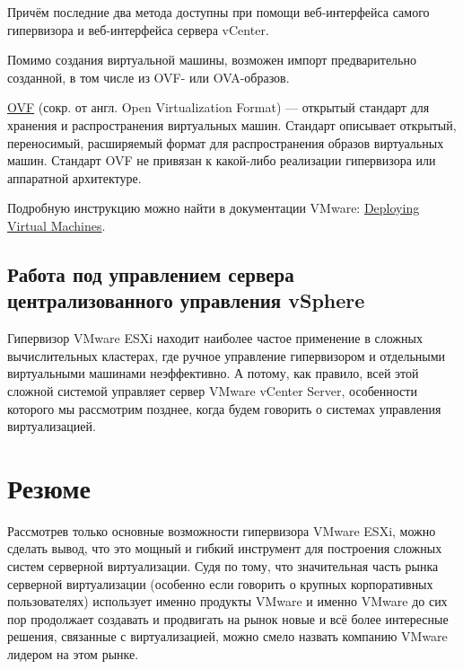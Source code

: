 \documentclass[14pt, a4paper]{article}
\begin{document}
Причём последние два метода доступны при помощи веб-интерфейса самого гипервизора и
веб-интерфейса сервера vCenter.

Помимо создания виртуальной машины, возможен импорт предварительно созданной, в том числе из
OVF- или OVA-образов.

\href{https://ru.wikipedia.org/wiki/Open_Virtualization_Format}{OVF} (сокр. от англ. Open Virtualization Format) — открытый стандарт для хранения и распространения
виртуальных машин. Стандарт описывает открытый, переносимый, расширяемый формат для
распространения образов виртуальных машин. Стандарт OVF не привязан к какой-либо реализации
гипервизора или аппаратной архитектуре.

Подробную инструкцию можно найти в документации VMware: \href{https://docs.vmware.com/en/VMware-vSphere/6.7/com.vmware.vsphere.vm_admin.doc/GUID-39D19B2B-A11C-42AE-AC80-DDA8682AB42C.html}{Deploying Virtual Machines}.\\

\subsection*{Работа под управлением сервера централизованного управления vSphere}

Гипервизор VMware ESXi находит наиболее частое применение в сложных вычислительных
кластерах, где ручное управление гипервизором и отдельными виртуальными машинами
неэффективно. А потому, как правило, всей этой сложной системой управляет сервер VMware vCenter
Server, особенности которого мы рассмотрим позднее, когда будем говорить о системах управления
виртуализацией.\newpage

\section*{Резюме}

Рассмотрев только основные возможности гипервизора VMware ESXi, можно сделать вывод, что это
мощный и гибкий инструмент для построения сложных систем серверной виртуализации. Судя по
тому, что значительная часть рынка серверной виртуализации (особенно если говорить о крупных
корпоративных пользователях) использует именно продукты VMware и именно VMware до сих пор
продолжает создавать и продвигать на рынок новые и всё более интересные решения, связанные с
виртуализацией, можно смело назвать компанию VMware лидером на этом рынке.\\
\end{document}
